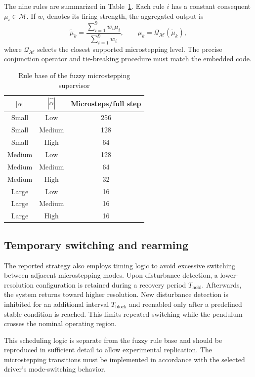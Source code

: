 \documentclass[conference]{IEEEtran}
\begin{document}
The nine rules are summarized in Table~\ref{tab:rules}. Each rule $i$ has a constant consequent $\mu_i\in\mathcal M$. If $w_i$ denotes its firing strength, the aggregated output is
\begin{equation}
 \widetilde\mu_k = \frac{\sum_{i=1}^{9}w_i\mu_i}{\sum_{i=1}^{9}w_i},\qquad
 \mu_k=\mathcal Q_{\mathcal M}(\widetilde\mu_k),
 \label{eq:sugeno}
\end{equation}
where $\mathcal Q_{\mathcal M}$ selects the closest supported microstepping level. The precise conjunction operator and tie-breaking procedure must match the embedded code.

\begin{table}[t]
\caption{Rule base of the fuzzy microstepping supervisor}
\label{tab:rules}
\centering\footnotesize
\begin{tabular}{ccc}
\toprule
$|\alpha|$ & $|\hat{\dot\alpha}|$ & Microsteps/full step\\
\midrule
Small & Low & 256\\
Small & Medium & 128\\
Small & High & 64\\
Medium & Low & 128\\
Medium & Medium & 64\\
Medium & High & 32\\
Large & Low & 16\\
Large & Medium & 16\\
Large & High & 16\\
\bottomrule
\end{tabular}
\end{table}

\subsection{Temporary switching and rearming}
The reported strategy also employs timing logic to avoid excessive switching between adjacent microstepping modes. Upon disturbance detection, a lower-resolution configuration is retained during a recovery period $T_{\mathrm{hold}}$. Afterwards, the system returns toward higher resolution. New disturbance detection is inhibited for an additional interval $T_{\mathrm{block}}$ and reenabled only after a predefined stable condition is reached. This limits repeated switching while the pendulum crosses the nominal operating region.

This scheduling logic is separate from the fuzzy rule base and should be reproduced in sufficient detail to allow experimental replication. The microstepping transitions must be implemented in accordance with the selected driver's mode-switching behavior.
\end{document}
